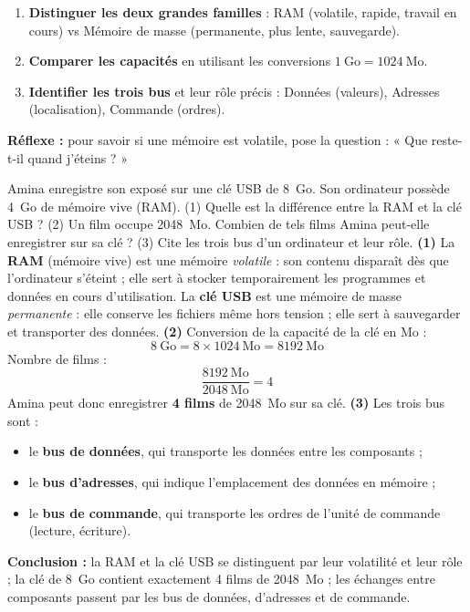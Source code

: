 \documentclass[11pt]{article}
\begin{document}
\begin{methode}
\begin{enumerate}
\item \textbf{Distinguer les deux grandes familles} : RAM (volatile, rapide, travail en cours) vs Mémoire de masse (permanente, plus lente, sauvegarde).
\item \textbf{Comparer les capacités} en utilisant les conversions $1\ \text{Go} = 1024\ \text{Mo}$.
\item \textbf{Identifier les trois bus} et leur rôle précis : Données (valeurs), Adresses (localisation), Commande (ordres).
\end{enumerate}
\textbf{Réflexe :} pour savoir si une mémoire est volatile, pose la question : « Que reste-t-il quand j'éteins ? »
\end{methode}

\begin{exoresolu}
Amina enregistre son exposé sur une clé USB de \SI{8}{Go}. Son ordinateur possède \SI{4}{Go} de mémoire vive (RAM). (1) Quelle est la différence entre la RAM et la clé USB ? (2) Un film occupe \SI{2048}{Mo}. Combien de tels films Amina peut-elle enregistrer sur sa clé ? (3) Cite les trois bus d'un ordinateur et leur rôle.
\tcblower
\textbf{(1)} La \textbf{RAM} (mémoire vive) est une mémoire \emph{volatile} : son contenu disparaît dès que l'ordinateur s'éteint ; elle sert à stocker temporairement les programmes et données en cours d'utilisation. La \textbf{clé USB} est une mémoire de masse \emph{permanente} : elle conserve les fichiers même hors tension ; elle sert à sauvegarder et transporter des données.
\textbf{(2)} Conversion de la capacité de la clé en Mo :
\[ 8\ \text{Go} = 8 \times 1024\ \text{Mo} = 8192\ \text{Mo} \]
Nombre de films :
\[ \frac{8192\ \text{Mo}}{2048\ \text{Mo}} = 4 \]
Amina peut donc enregistrer \textbf{4 films} de \SI{2048}{Mo} sur sa clé.
\textbf{(3)} Les trois bus sont :
\begin{itemize}
\item le \textbf{bus de données}, qui transporte les données entre les composants ;
\item le \textbf{bus d'adresses}, qui indique l'emplacement des données en mémoire ;
\item le \textbf{bus de commande}, qui transporte les ordres de l'unité de commande (lecture, écriture).
\end{itemize}
\textbf{Conclusion :} la RAM et la clé USB se distinguent par leur volatilité et leur rôle ; la clé de \SI{8}{Go} contient exactement 4 films de \SI{2048}{Mo} ; les échanges entre composants passent par les bus de données, d'adresses et de commande.
\end{exoresolu}
\end{document}
